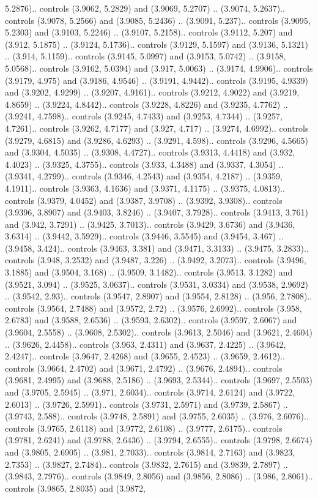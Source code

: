 5.2876).. controls (3.9062, 5.2829) and (3.9069, 5.2707) .. (3.9074, 5.2637).. controls (3.9078, 5.2566) and (3.9085, 5.2436) .. (3.9091, 5.237).. controls (3.9095, 5.2303) and (3.9103, 5.2246) .. (3.9107, 5.2158).. controls (3.9112, 5.207) and (3.912, 5.1875) .. (3.9124, 5.1736).. controls (3.9129, 5.1597) and (3.9136, 5.1321) .. (3.914, 5.1159).. controls (3.9145, 5.0997) and (3.9153, 5.0742) .. (3.9158, 5.0568).. controls (3.9162, 5.0394) and (3.917, 5.0063) .. (3.9174, 4.9906).. controls (3.9179, 4.975) and (3.9186, 4.9546) .. (3.9191, 4.9442).. controls (3.9195, 4.9339) and (3.9202, 4.9299) .. (3.9207, 4.9161).. controls (3.9212, 4.9022) and (3.9219, 4.8659) .. (3.9224, 4.8442).. controls (3.9228, 4.8226) and (3.9235, 4.7762) .. (3.9241, 4.7598).. controls (3.9245, 4.7433) and (3.9253, 4.7344) .. (3.9257, 4.7261).. controls (3.9262, 4.7177) and (3.927, 4.717) .. (3.9274, 4.6992).. controls (3.9279, 4.6815) and (3.9286, 4.6293) .. (3.9291, 4.598).. controls (3.9296, 4.5665) and (3.9304, 4.5035) .. (3.9308, 4.4727).. controls (3.9313, 4.4418) and (3.932, 4.4023) .. (3.9325, 4.3755).. controls (3.933, 4.3488) and (3.9337, 4.3054) .. (3.9341, 4.2799).. controls (3.9346, 4.2543) and (3.9354, 4.2187) .. (3.9359, 4.1911).. controls (3.9363, 4.1636) and (3.9371, 4.1175) .. (3.9375, 4.0813).. controls (3.9379, 4.0452) and (3.9387, 3.9708) .. (3.9392, 3.9308).. controls (3.9396, 3.8907) and (3.9403, 3.8246) .. (3.9407, 3.7928).. controls (3.9413, 3.761) and (3.942, 3.7291) .. (3.9425, 3.7013).. controls (3.9429, 3.6736) and (3.9436, 3.6314) .. (3.9442, 3.5929).. controls (3.9446, 3.5545) and (3.9454, 3.467) .. (3.9458, 3.424).. controls (3.9463, 3.381) and (3.9471, 3.3133) .. (3.9475, 3.2833).. controls (3.948, 3.2532) and (3.9487, 3.226) .. (3.9492, 3.2073).. controls (3.9496, 3.1885) and (3.9504, 3.168) .. (3.9509, 3.1482).. controls (3.9513, 3.1282) and (3.9521, 3.094) .. (3.9525, 3.0637).. controls (3.9531, 3.0334) and (3.9538, 2.9692) .. (3.9542, 2.93).. controls (3.9547, 2.8907) and (3.9554, 2.8128) .. (3.956, 2.7808).. controls (3.9564, 2.7488) and (3.9572, 2.72) .. (3.9576, 2.6992).. controls (3.958, 2.6783) and (3.9588, 2.6536) .. (3.9593, 2.6302).. controls (3.9597, 2.6067) and (3.9604, 2.5558) .. (3.9608, 2.5302).. controls (3.9613, 2.5046) and (3.9621, 2.4604) .. (3.9626, 2.4458).. controls (3.963, 2.4311) and (3.9637, 2.4225) .. (3.9642, 2.4247).. controls (3.9647, 2.4268) and (3.9655, 2.4523) .. (3.9659, 2.4612).. controls (3.9664, 2.4702) and (3.9671, 2.4792) .. (3.9676, 2.4894).. controls (3.9681, 2.4995) and (3.9688, 2.5186) .. (3.9693, 2.5344).. controls (3.9697, 2.5503) and (3.9705, 2.5945) .. (3.971, 2.6034).. controls (3.9714, 2.6124) and (3.9722, 2.6013) .. (3.9726, 2.5991).. controls (3.9731, 2.5971) and (3.9739, 2.5867) .. (3.9743, 2.588).. controls (3.9748, 2.5891) and (3.9755, 2.6035) .. (3.976, 2.6076).. controls (3.9765, 2.6118) and (3.9772, 2.6108) .. (3.9777, 2.6175).. controls (3.9781, 2.6241) and (3.9788, 2.6436) .. (3.9794, 2.6555).. controls (3.9798, 2.6674) and (3.9805, 2.6905) .. (3.981, 2.7033).. controls (3.9814, 2.7163) and (3.9823, 2.7353) .. (3.9827, 2.7484).. controls (3.9832, 2.7615) and (3.9839, 2.7897) .. (3.9843, 2.7976).. controls (3.9849, 2.8056) and (3.9856, 2.8086) .. (3.986, 2.8061).. controls (3.9865, 2.8035) and (3.9872, 